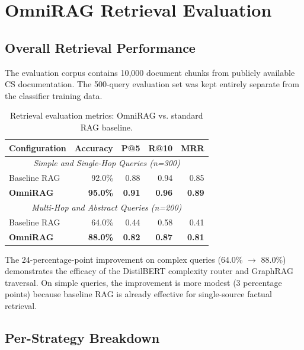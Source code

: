 \section{OmniRAG Retrieval Evaluation}
\label{sec:retrieval-results}

\subsection{Overall Retrieval Performance}
\label{subsec:overall-retrieval}

The evaluation corpus contains 10,000 document chunks from publicly available CS documentation. The 500-query evaluation set was kept entirely separate from the classifier training data.

\begin{table}[ht]
    \centering
    \caption{Retrieval evaluation metrics: OmniRAG vs. standard RAG baseline.}
    \label{tab:retrieval}
    \renewcommand{\arraystretch}{1.3}
    \begin{tabular}{lrrrr}
        \toprule
        \textbf{Configuration} & \textbf{Accuracy} & \textbf{P@5} & \textbf{R@10} & \textbf{MRR} \\
        \midrule
        \multicolumn{5}{c}{\textit{Simple and Single-Hop Queries (n=300)}} \\
        \midrule
        Baseline RAG         & 92.0\%       & 0.88 & 0.94 & 0.85 \\
        \textbf{OmniRAG}     & \textbf{95.0\%} & \textbf{0.91} & \textbf{0.96} & \textbf{0.89} \\
        \midrule
        \multicolumn{5}{c}{\textit{Multi-Hop and Abstract Queries (n=200)}} \\
        \midrule
        Baseline RAG         & 64.0\% & 0.44 & 0.58 & 0.41 \\
        \textbf{OmniRAG}     & \textbf{88.0\%} & \textbf{0.82} & \textbf{0.87} & \textbf{0.81} \\
        \bottomrule
    \end{tabular}
\end{table}

The 24-percentage-point improvement on complex queries (64.0\% $\rightarrow$ 88.0\%) demonstrates the efficacy of the DistilBERT complexity router and GraphRAG traversal. On simple queries, the improvement is more modest (3 percentage points) because baseline RAG is already effective for single-source factual retrieval.

\subsection{Per-Strategy Breakdown}
\label{subsec:per-strategy}

